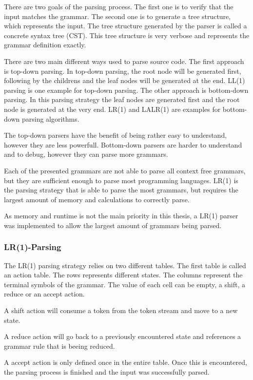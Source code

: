 There are two goals of the parsing process. The first one is to verify that the input matches the grammar. The second one is to generate a tree structure, which represents the input. The tree structure generated by the parser is called a concrete syntax tree (CST). This tree structure is very verbose and represents the grammar definition exactly.

There are two main different ways used to parse source code. The first approach is top-down parsing. In top-down parsing, the root node will be generated first, following by the childrens and the leaf nodes will be generated at the end. LL(1) parsing is one example for top-down parsing. The other approach is bottom-down parsing. In this parsing strategy the leaf nodes are generated first and the root node is generated at the very end. LR(1) and LALR(1) are examples for bottom-down parsing algorithms.

The top-down parsers have the benefit of being rather easy to understand, however they are less powerfull. Bottom-down parsers are harder to understand and to debug, however they can parse more grammars.

Each of the presented grammars are not able to parse all context free grammars, but they are sufficient enough to parse most programming languages. LR(1) is the parsing strategy that is able to parse the most grammars, but requires the largest amount of memory and calculations to correctly parse.

As memory and runtime is not the main priority in this thesis, a LR(1) parser was implemented to allow the largest amount of grammars being parsed.

\subsubsection{LR(1)-Parsing}

The LR(1) parsing strategy relies on two different tables. The first table is called an action table. The rows represents different states. The columns represent the terminal symbols of the grammar. The value of each cell can be empty, a shift, a reduce or an accept action. 

A shift action will consume a token from the token stream and move to a new state.

A reduce action will go back to a previously encountered state and references a grammar rule that is beeing reduced.

A accept action is only defined once in the entire table. Once this is encountered, the parsing process is finished and the input was successfully parsed.

